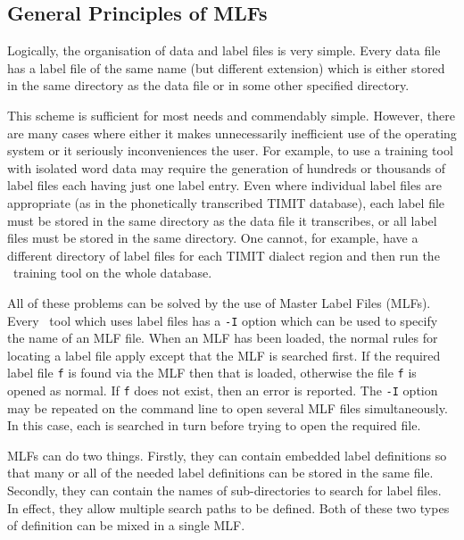 
\subsection{General Principles of MLFs}

Logically, the organisation of data and label files is very simple.
Every data file has a label file of the same name (but
different extension) which is either stored in the same directory as
the data file or in some other specified directory.

This scheme is sufficient for most needs and commendably simple.
However, there are many cases where either it makes unnecessarily
inefficient use of the operating system or it seriously inconveniences
the user.  For example, to use a training tool with
isolated word data may require the generation of hundreds or thousands of
label files each having just one label entry.  Even where individual
label files are appropriate (as in the phonetically transcribed TIMIT
database), each label file must be
stored in the same directory as the data file it transcribes, or all label files
must be stored in the same directory.  One cannot, for example, have a
different directory of label files for each TIMIT dialect region and
then run the \HTK\ training tool  on the whole database.

All of these problems can be solved by the use of Master Label Files
(MLFs).  Every \HTK\ tool which uses label files has a 
\texttt{-I} option
which can be used to specify the name of an MLF file.  When an MLF has been
loaded, the normal rules for locating a label file apply except that
the MLF is searched first.  If the required label file \texttt{f} is found via
the MLF then that is loaded, otherwise the file \texttt{f} is opened as normal.
If \texttt{f} does not exist, then an error is reported.
The \texttt{-I} option may be repeated on the command line to open
several MLF files simultaneously.  In this case, each is searched in turn
before trying to open the required file.

MLFs can do two things.  Firstly, they can contain 
embedded label definitions 
so that many or all of the needed label definitions can be
stored in the same file.  Secondly, they can contain the names of
sub-directories to search for label files.  In effect, they allow
multiple search paths 
to be defined.  Both of these two types of
definition can be mixed in a single MLF.


